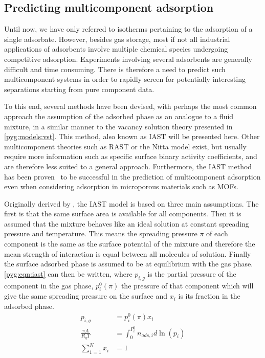
\subsection{Predicting multicomponent adsorption}\label{pyg:iast}

Until now, we have only referred to isotherms pertaining to the adsorption
of a single adsorbate. However, besides gas storage, most if not all
industrial applications of adsorbents involve multiple chemical
species undergoing competitive adsorption. Experiments involving
several adsorbents are generally difficult and time consuming.
There is therefore a need to predict such multicomponent systems
in order to rapidly screen for potentially interesting separations
starting from pure component data.

To this end, several methods have been devised, with perhaps
the most common approach the assumption of the adsorbed phase as
an analogue to a fluid mixture, in a similar manner to the
vacancy solution theory presented in \autoref{pyg:models:vst}.
This method, also known as \gls{IAST}
will be presented here. Other multicomponent theories
such as \gls{RAST} or the Nitta model
exist, but usually require more information such as specific
surface binary activity coefficients, and are therefore less suited to
a general approach. Furthermore, the \gls{IAST} method has been
proven~\cite{cessfordEvaluationIdealAdsorbed2012,%
	vanheestIdentificationMetalOrganic2012} to be successful in the
prediction of multicomponent adsorption even when considering
adsorption in microporous materials such as \glspl{MOF}.

Originally derived by \citet{myersThermodynamicsMixedgasAdsorption1965},
the \gls{IAST} model is based on three main assumptions. The first is that the
same surface area is available for all components. Then it is
assumed that the mixture behaves like an ideal solution at constant
spreading pressure and temperature. This means the spreading pressure \(\pi\) of
each component is the same as the surface potential of the mixture
and therefore the mean strength of interaction is equal between all
molecules of solution. Finally the surface adsorbed phase is assumed
to be at equilibrium with the gas phase. \autoref{pyg:eqn:iast}
can then be written, where \(p_{i,g}\) is the partial pressure of
the component in the gas phase, \( p_i^0(\pi)\) the pressure of
that component which will give the same spreading pressure on the
surface and \(x_i\) is its fraction in the adsorbed phase.
%
\begin{align}
	p_{i,g}             & = p_i^0(\pi)x_i                              %
	\label{pyg:eqn:iast}                                               \\
	\frac{\pi A}{R_g T} & = \int_{0}^{P_{i}^{0}} n_{ads,i} d\ln{(p_i)} %
	\label{pyg:eqn:iast-2}                                             \\
	\sum_{1=1}^{N} x_i  & = 1                                          %
	\label{pyg:eqn:iast-3}
\end{align}

